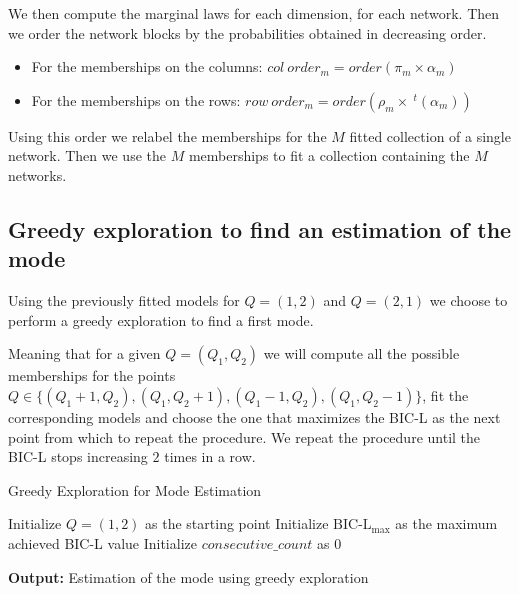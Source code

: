 \documentclass[12pt,a4paper]{report}
\begin{document}
We then compute the marginal laws for each dimension, for each network. Then 
we order the network blocks by the probabilities obtained in decreasing order.
\begin{itemize}
    \item For the memberships on the columns: 
    $col~order_m = order\left(\pi_m \times \alpha_m\right)$ 
    \item For the memberships on the rows:
    $row~order_m = order\left(\rho_m \times ~^{t}(\alpha_m)\right)$ 
\end{itemize}

Using this order we relabel the memberships for the $M$ fitted collection of a
single network.
Then we use the $M$ memberships to fit a collection containing the $M$ networks.
\subsection{Greedy exploration to find an estimation of the mode}
Using the previously fitted models for $Q = (1,2)$ and $Q = (2,1)$ we choose to
perform a greedy exploration to find a first mode.

Meaning that for a given $Q = (Q_1, Q_2)$ we will compute all the possible 
memberships for the points $Q \in \{(Q_1 + 1, Q_2),(Q_1, Q_2 + 1),(Q_1 - 1, Q_2),
(Q_1, Q_2 - 1)\}$, fit
the corresponding models and choose the one that maximizes the BIC-L as the 
next point from which to repeat the procedure. We repeat the procedure until the
BIC-L stops increasing $2$ times in a row.

\begin{algorithm}[H]
    \caption{Greedy Exploration for Mode Estimation}
    \SetAlgoLined
    
    
    \BlankLine
    Initialize $Q = (1,2)$ as the starting point
    Initialize $\text{BIC-L}_{\text{max}}$ as the maximum achieved BIC-L value
    Initialize $consecutive\_count$ as 0
    
    \BlankLine
    
    \BlankLine
    \textbf{Output:} Estimation of the mode using greedy exploration
\end{algorithm}
\end{document}
